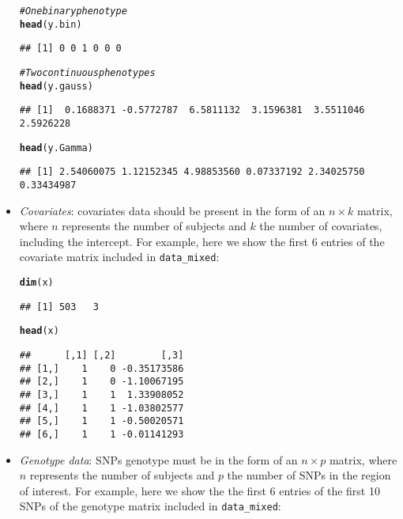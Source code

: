 \documentclass{article}\usepackage[]{graphicx}\usepackage[]{color}
\makeatletter
\newcommand{\hlcom}[1]{\textcolor[rgb]{0.678,0.584,0.686}{\textit{#1}}}%
\newcommand{\hlstd}[1]{\textcolor[rgb]{0.345,0.345,0.345}{#1}}%
\newcommand{\hlkwd}[1]{\textcolor[rgb]{0.737,0.353,0.396}{\textbf{#1}}}%
\newenvironment{kframe}{%
 \def\at@end@of@kframe{}%
 \ifinner\ifhmode%
  \def\at@end@of@kframe{\end{minipage}}%
  \begin{minipage}{\columnwidth}%
 \fi\fi%
 \def\FrameCommand##1{\hskip\@totalleftmargin \hskip-\fboxsep
 \colorbox{shadecolor}{##1}\hskip-\fboxsep
     \hskip-\linewidth \hskip-\@totalleftmargin \hskip\columnwidth}%
 \MakeFramed {\advance\hsize-\width
   \@totalleftmargin\z@ \linewidth\hsize
   \@setminipage}}%
 {\par\unskip\endMakeFramed%
 \at@end@of@kframe}
\newenvironment{knitrout}{}{} %
\makeatother
\begin{document}
\begin{itemize}
\begin{knitrout}
\begin{kframe}
\begin{alltt}
  \hlcom{#One binary phenotype}
  \hlkwd{head}\hlstd{(y.bin)}
\end{alltt}
\begin{verbatim}
## [1] 0 0 1 0 0 0
\end{verbatim}
\begin{alltt}
  \hlcom{#Two continuous phenotypes}
  \hlkwd{head}\hlstd{(y.gauss)}
\end{alltt}
\begin{verbatim}
## [1]  0.1688371 -0.5772787  6.5811132  3.1596381  3.5511046  2.5926228
\end{verbatim}
\begin{alltt}
  \hlkwd{head}\hlstd{(y.Gamma)}
\end{alltt}
\begin{verbatim}
## [1] 2.54060075 1.12152345 4.98853560 0.07337192 2.34025750 0.33434987
\end{verbatim}
\end{kframe}
\end{knitrout}
\item \emph{Covariates}: covariates data should be present in the form of an $n\times k$ matrix, where $n$ represents the number of subjects and $k$ the number of covariates, including the intercept. For example, here we show the first 6 entries of the covariate matrix included in \texttt{data\_mixed}:
\begin{knitrout}
\color{fgcolor}\begin{kframe}
\begin{alltt}
  \hlkwd{dim}\hlstd{(x)}
\end{alltt}
\begin{verbatim}
## [1] 503   3
\end{verbatim}
\begin{alltt}
  \hlkwd{head}\hlstd{(x)}
\end{alltt}
\begin{verbatim}
##      [,1] [,2]        [,3]
## [1,]    1    0 -0.35173586
## [2,]    1    0 -1.10067195
## [3,]    1    1  1.33908052
## [4,]    1    1 -1.03802577
## [5,]    1    1 -0.50020571
## [6,]    1    1 -0.01141293
\end{verbatim}
\end{kframe}
\end{knitrout}
\item \emph{Genotype data}: SNPs genotype must be in the form of
  an $n\times p$ matrix, where $n$ represents the number of subjects and $p$ the number of SNPs in the region of interest. For example, here we show the the first 6 entries of the first 10 SNPs of the genotype matrix included in \texttt{data\_mixed}:

\end{itemize}
\end{document}
